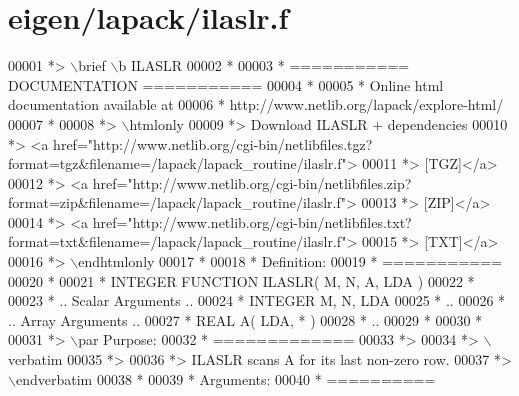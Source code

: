 \hypertarget{eigen_2lapack_2ilaslr_8f_source}{}\section{eigen/lapack/ilaslr.f}
\label{eigen_2lapack_2ilaslr_8f_source}

\begin{DoxyCode}
00001 \textcolor{comment}{*> \(\backslash\)brief \(\backslash\)b ILASLR}
00002 \textcolor{comment}{*}
00003 \textcolor{comment}{*  =========== DOCUMENTATION ===========}
00004 \textcolor{comment}{*}
00005 \textcolor{comment}{* Online html documentation available at }
00006 \textcolor{comment}{*            http://www.netlib.org/lapack/explore-html/ }
00007 \textcolor{comment}{*}
00008 \textcolor{comment}{*> \(\backslash\)htmlonly}
00009 \textcolor{comment}{*> Download ILASLR + dependencies }
00010 \textcolor{comment}{*> <a
       href="http://www.netlib.org/cgi-bin/netlibfiles.tgz?format=tgz&filename=/lapack/lapack\_routine/ilaslr.f"> }
00011 \textcolor{comment}{*> [TGZ]</a> }
00012 \textcolor{comment}{*> <a
       href="http://www.netlib.org/cgi-bin/netlibfiles.zip?format=zip&filename=/lapack/lapack\_routine/ilaslr.f"> }
00013 \textcolor{comment}{*> [ZIP]</a> }
00014 \textcolor{comment}{*> <a
       href="http://www.netlib.org/cgi-bin/netlibfiles.txt?format=txt&filename=/lapack/lapack\_routine/ilaslr.f"> }
00015 \textcolor{comment}{*> [TXT]</a>}
00016 \textcolor{comment}{*> \(\backslash\)endhtmlonly }
00017 \textcolor{comment}{*}
00018 \textcolor{comment}{*  Definition:}
00019 \textcolor{comment}{*  ===========}
00020 \textcolor{comment}{*}
00021 \textcolor{comment}{*       INTEGER FUNCTION ILASLR( M, N, A, LDA )}
00022 \textcolor{comment}{* }
00023 \textcolor{comment}{*       .. Scalar Arguments ..}
00024 \textcolor{comment}{*       INTEGER            M, N, LDA}
00025 \textcolor{comment}{*       ..}
00026 \textcolor{comment}{*       .. Array Arguments ..}
00027 \textcolor{comment}{*       REAL               A( LDA, * )}
00028 \textcolor{comment}{*       ..}
00029 \textcolor{comment}{*  }
00030 \textcolor{comment}{*}
00031 \textcolor{comment}{*> \(\backslash\)par Purpose:}
00032 \textcolor{comment}{*  =============}
00033 \textcolor{comment}{*>}
00034 \textcolor{comment}{*> \(\backslash\)verbatim}
00035 \textcolor{comment}{*>}
00036 \textcolor{comment}{*> ILASLR scans A for its last non-zero row.}
00037 \textcolor{comment}{*> \(\backslash\)endverbatim}
00038 \textcolor{comment}{*}
00039 \textcolor{comment}{*  Arguments:}
00040 \textcolor{comment}{*  ==========}

\end{DoxyCode}
